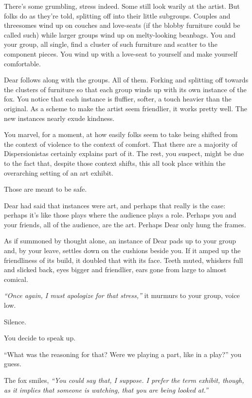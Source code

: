 There's some grumbling, stress indeed. Some still look warily at the artist. But folks do as they're told, splitting off into their little subgroups. Couples and threesomes wind up on couches and love-seats (if the blobby furniture could be called such) while larger groups wind up on melty-looking beanbags. You and your group, all single, find a cluster of such furniture and scatter to the component pieces. You wind up with a love-seat to yourself and make yourself comfortable.

Dear follows along with the groups. All of them. Forking and splitting off towards the clusters of furniture so that each group winds up with its own instance of the fox. You notice that each instance is fluffier, softer, a touch heavier than the original. As a scheme to make the artist seem friendlier, it works pretty well. The new instances nearly exude kindness.

You marvel, for a moment, at how easily folks seem to take being shifted from the context of violence to the context of comfort. That there are a majority of Dispersionistas certainly explains part of it. The rest, you suspect, might be due to the fact that, despite those context shifts, this all took place within the overarching setting of an art exhibit.

Those are meant to be safe.

Dear had said that instances were art, and perhaps that really is the case: perhaps it's like those plays where the audience plays a role. Perhaps you and your friends, all of the audience, are the art. Perhaps Dear only hung the frames.

As if summoned by thought alone, an instance of Dear pads up to your group and, by your leave, settles down on the cushions beside you. If it amped up the friendliness of its build, it doubled that with its face. Teeth muted, whiskers full and slicked back, eyes bigger and friendlier, ears gone from large to almost comical.

\emph{``Once again, I must apologize for that stress,''} it murmurs to your group, voice low.

Silence.

You decide to speak up.

``What was the reasoning for that? Were we playing a part, like in a play?'' you guess.

The fox smiles, \emph{``You could say that, I suppose. I prefer the term exhibit, though, as it implies that someone is watching, that you are being looked at.''}

